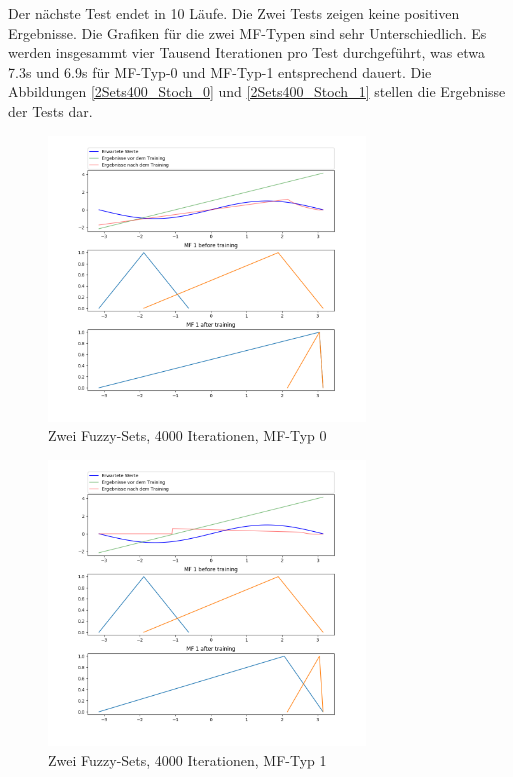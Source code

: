 Der nächste Test endet in 10 Läufe. Die Zwei Tests zeigen keine positiven Ergebnisse. Die Grafiken für die zwei MF-Typen sind sehr Unterschiedlich. Es werden insgesammt vier Tausend Iterationen pro Test durchgeführt, was etwa 7.3s und 6.9s für MF-Typ-0 und MF-Typ-1 entsprechend dauert. Die Abbildungen \ref{2Sets400_Stoch_0} und \ref{2Sets400_Stoch_1} stellen die Ergebnisse der Tests dar.

\begin{figure}[htbp]\label{2Sets4000_Stoch_0}
	\centering
	\includegraphics[width=0.75\textwidth]{images/sinus/Stochastic/sinus 1 Input 2 Sets 4000 Epochs Stochastic Gradient Descent two equations mf.png}
	\caption{Zwei Fuzzy-Sets, 4000 Iterationen, MF-Typ 0}
\end{figure}
\begin{figure}[htbp]\label{2Sets4000_Stoch_1}
	\centering
	\includegraphics[width=0.75\textwidth]{images/sinus/Stochastic/sinus 1 Input 2 Sets 4000 Epochs Stochastic Gradient Descent one equation mf.png}
	\caption{Zwei Fuzzy-Sets, 4000 Iterationen, MF-Typ 1}
\end{figure}

